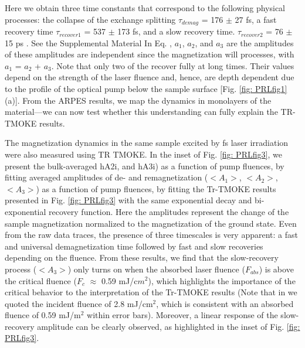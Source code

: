 Here we obtain three time constants that correspond to the following physical processes: the collapse of the exchange splitting $\tau_{demag}$ =  176 $\pm$ 27 fs, a fast recovery time $\tau_{recover1}$ = 537 $\pm$ 173 fs, and a slow recovery time. $\tau_{recover2}$ = 76 $\pm$ 15 ps \cite{Tengdin2018}. See the Supplemental Material In Eq. \label{eqn:1}, $a_1$, $a_2$, and $a_3$ are the amplitudes of these amplitudes are independent since the magnetization will processes, with $a_1$ = $a_2$ + $a_3$. Note that only two of the recover fully at long times. Their values depend on the strength of the laser fluence and, hence, are depth dependent due to the profile of the optical pump below the sample surface [Fig. \ref{fig: PRLfig1}(a)]. From the ARPES results, we map the dynamics in monolayers of the material—we can now test whether this understanding can fully explain the TR- TMOKE results.

The magnetization dynamics in the same sample excited by fs laser irradiation were also measured using TR TMOKE. In the inset of Fig. \ref{fig: PRLfig3}, we present the bulk-averaged hA2i, and hA3i) as a function of pump fluences, by fitting averaged amplitudes of de- and remagnetization ($<A_1>$, $<A_2>$, $<A_3>$) as a function of pump fluences, by fitting the Tr-TMOKE results presented in Fig. \ref{fig: PRLfig3} with the same exponential decay and bi-exponential recovery function. Here the amplitudes represent the change of the sample magnetization normalized to the magnetization of the ground state. Even from the raw data traces, the presence of three timescales is very apparent: a fast and universal demagnetization time followed by fast and slow recoveries depending on the fluence.  From these results, we find that the slow-recovery process ($<A_3>$) only turns on when the absorbed laser fluence ($F_{abs}$) is above the critical fluence ($F_c$ $\approx$ 0.59 mJ/c$m^2$), which highlights the importance of the critical behavior to the interpretation of the Tr-TMOKE results (Note that in \cite{Zhang2012} we quoted the incident fluence of 2.8 mJ/cm$^2$, which is consistent with an absorbed fluence of 0.59 mJ/m$^2$ within error bars). Moreover, a linear response of the slow-recovery amplitude  can be clearly observed, as highlighted in the inset of Fig. \ref*{fig: PRLfig3}.

